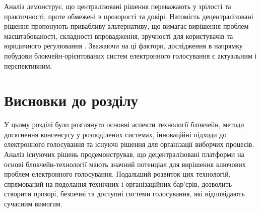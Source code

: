 \documentclass[14pt]{extreport}
\begin{document}
  \begin{table}[H]
    \caption{\\\centering\textbf{Порівняння централізованих та децентралізованих систем голосування}}
    \label{tab:voting_systems_comparison}
  \end{table}
  
  Аналіз демонструє, що централізовані рішення переважають у зрілості та практичності, проте обмежені в прозорості та довірі. Натомість децентралізовані рішення пропонують привабливу альтернативу, що вимагає вирішення проблем масштабованості, складності впровадження, зручності для користувачів та юридичного регулювання \cite{ieee:almeida}. Зважаючи на ці фактори, дослідження в напрямку побудови блокчейн-орієнтованих систем електронного голосування є актуальним і перспективним.
  
  \section{Висновки до розділу}
  
  У цьому розділі було розглянуто основні аспекти технології блокчейн, методи досягнення консенсусу у розподілених системах, інноваційні підходи до електронного голосування та існуючі рішення для організації виборчих процесів. Аналіз існуючих рішень продемонстрував, що децентралізовані платформи на основі блокчейн-технології мають значний потенціал для вирішення ключових проблем електронного голосування. Подальший розвиток цих технологій, спрямований на подолання технічних і організаційних бар'єрів, дозволить створити прозорі, безпечні та доступні системи голосування, які відповідають сучасним вимогам.
  
\end{document}
